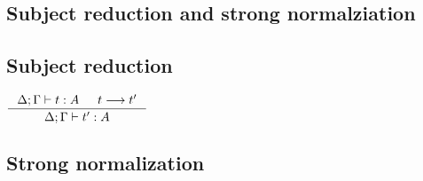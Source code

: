 \subsection{Subject reduction and strong normalziation}\label{sec:f:srsn}
\subsection*{Subject reduction}
\begin{theorem}
$\inference{\Delta;\Gamma |- t : A  & t --> t'}{\Delta;\Gamma |- t' : A}$
\end{theorem}


\subsection*{Strong normalization}
